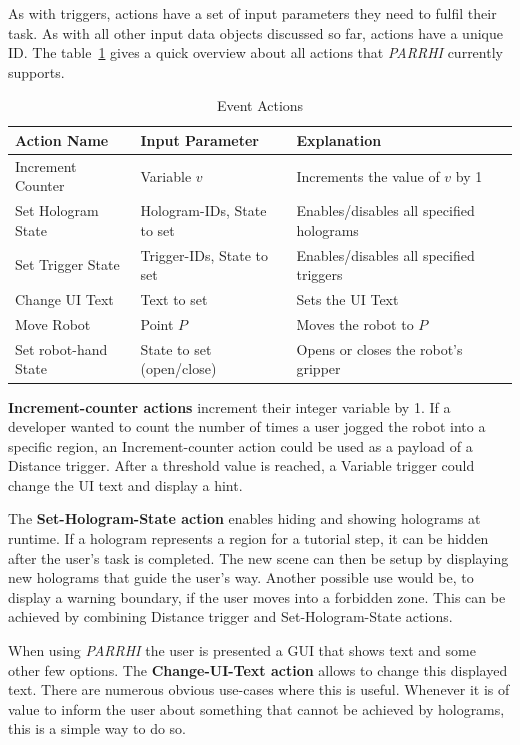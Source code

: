 As with triggers, actions have a set of input parameters they need to fulfil their task. As with all other input data objects discussed so far, actions have a unique ID. The table~\ref{Table:Actions} gives a quick overview about all actions that \textit{PARRHI} currently supports.

\begin{table}
	\caption{Event Actions}
	\label{Table:Actions}
	\centering
	\begin{tabular}{lll}
		\toprule
		Action Name & Input Parameter		& Explanation	\\		
		\midrule
		Increment Counter  	& Variable $v$					& Increments the value of $v$ by 1 \\
		Set Hologram State 	& Hologram-IDs, State to set	& Enables/disables all specified holograms \\
		Set Trigger State  	& Trigger-IDs, State to set    	& Enables/disables all specified triggers \\
		Change UI Text	  	& Text to set					& Sets the UI Text\\
		Move Robot			& Point $P$						& Moves the robot to $P$ \\
		Set robot-hand State & State to set (open/close)		& Opens or closes the robot's gripper \\
		\bottomrule
	\end{tabular}
\end{table}

\textbf{Increment-counter actions} increment their integer variable by 1. If a developer wanted to count the number of times a user jogged the robot into a specific region, an Increment-counter action could be used as a payload of a Distance trigger. After a threshold value is reached, a Variable trigger could change the UI text and display a hint.

The \textbf{Set-Hologram-State action} enables hiding and showing holograms at runtime. If a hologram represents a region for a tutorial step, it can be hidden after the user's task is completed. The new scene can then be setup by displaying new holograms that guide the user's way. Another possible use would be, to display a warning boundary, if the user moves into a forbidden zone. This can be achieved by combining Distance trigger and Set-Hologram-State actions.

When using \textit{PARRHI} the user is presented a GUI that shows text and some other few options. The \textbf{Change-UI-Text action} allows to change this displayed text. There are numerous obvious use-cases where this is useful. Whenever it is of value to inform the user about something that cannot be achieved by holograms, this is a simple way to do so.

